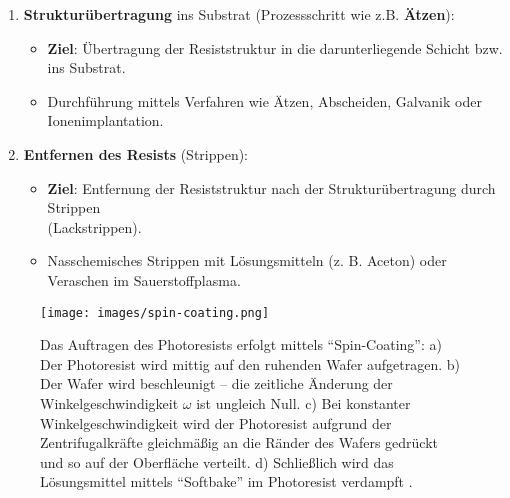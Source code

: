\documentclass{article} %
\begin{document}
\begin{enumerate}
    \item \textbf{Strukturübertragung} ins Substrat (Prozessschritt wie z.B. \textbf{Ätzen}):
    \begin{itemize}
        \item \textbf{Ziel}: Übertragung der Resiststruktur in die darunterliegende Schicht bzw. ins Substrat.
        \item Durchführung mittels Verfahren wie Ätzen, Abscheiden, Galvanik oder Ionenimplantation.
    \end{itemize}

    \item \textbf{Entfernen des Resists} (Strippen):
    \begin{itemize}
        \item \textbf{Ziel}: Entfernung der Resiststruktur nach der Strukturübertragung durch Strippen \\ (Lackstrippen).
        \item Nasschemisches Strippen mit Lösungsmitteln (z. B. Aceton) oder Veraschen im Sauerstoffplasma.
    \end{itemize}
\end{enumerate}

\begin{figure}[htb!]
    \centering
    \texttt{[image: images/spin-coating.png]} %
    \captionsetup{labelfont=bf, width=.75\textwidth} %
    \caption{Das Auftragen des Photoresists erfolgt mittels ``Spin-Coating'': a) Der Photoresist wird mittig auf den ruhenden Wafer aufgetragen. b) Der Wafer wird beschleunigt -- die zeitliche Änderung der Winkelgeschwindigkeit $\omega$ ist ungleich Null. c) Bei konstanter Winkelgeschwindigkeit wird der Photoresist aufgrund der Zentrifugalkräfte gleichmäßig an die Ränder des Wafers gedrückt und so auf der Oberfläche verteilt. d) Schließlich wird das Lösungsmittel mittels ``Softbake'' im Photoresist verdampft \cite{Sankapal2023}.}
    \label{fig:spin-coating}
\end{figure}

%
\end{document}
